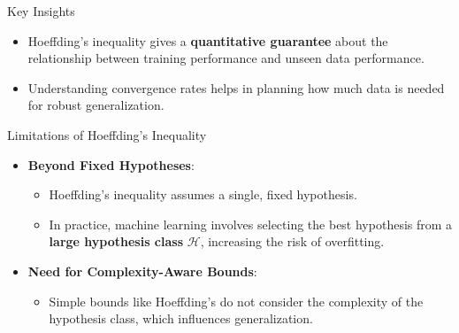 \documentclass[
  ignorenonframetext,
]{beamer}
\providecommand{\tightlist}{%
  \setlength{\itemsep}{0pt}\setlength{\parskip}{0pt}}\usepackage{longtable,booktabs,array}
\begin{document}
\begin{frame}
\begin{block}{Key Insights}
\label{key-insights-1}
\begin{itemize}
\tightlist
\item
  Hoeffding's inequality gives a \textbf{quantitative guarantee} about
  the relationship between training performance and unseen data
  performance.
\item
  Understanding convergence rates helps in planning how much data is
  needed for robust generalization.
\end{itemize}
\end{block}
\end{frame}

\begin{frame}{Limitations of Hoeffding's Inequality}
\label{limitations-of-hoeffdings-inequality}
\begin{itemize}
\tightlist
\item
  \textbf{Beyond Fixed Hypotheses}:

  \begin{itemize}
  \tightlist
  \item
    Hoeffding's inequality assumes a single, fixed hypothesis.
  \item
    In practice, machine learning involves selecting the best hypothesis
    from a \textbf{large hypothesis class} \(\mathcal{H}\), increasing
    the risk of overfitting.
  \end{itemize}
\item
  \textbf{Need for Complexity-Aware Bounds}:

  \begin{itemize}
  \tightlist
  \item
    Simple bounds like Hoeffding's do not consider the complexity of the
    hypothesis class, which influences generalization.
  \end{itemize}
\end{itemize}
\end{frame}
\end{document}
